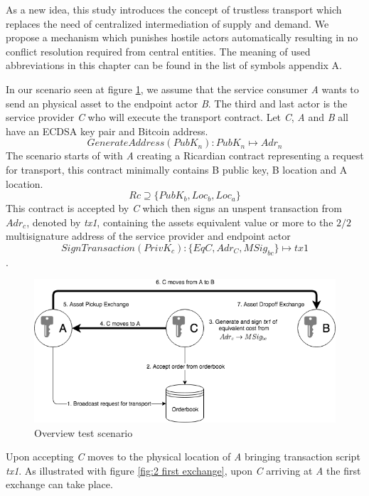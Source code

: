 As a new idea, this study introduces the concept of trustless transport which replaces the need of centralized intermediation of supply and demand. We propose a mechanism which punishes hostile actors automatically resulting in no conflict resolution required from central entities. The meaning of used abbreviations in this chapter can be found in the list of symbols appendix A.\par
In our scenario seen at figure \ref{fig:1 main overview}, we assume that the service consumer \textit{A} wants to send an physical asset to the endpoint actor \textit{B}. The third and last actor is the service provider \textit{C} who will execute the transport contract. Let \textit{C}, \textit{A} and \textit{B} all have an ECDSA key pair and Bitcoin address. \[GenerateAddress(PubK_n)\colon PubK_n \mapsto Adr_n\]
The scenario starts of with \textit{A} creating a Ricardian contract representing a request for transport, this contract minimally contains B public key, B location and A location.
\[Rc \supseteq \{PubK_b, Loc_b, Loc_a\}\]
This contract is accepted by \textit{C} which then signs an unspent transaction from $Adr_c$, denoted by \textit{tx1}, containing the assets equivalent value or more to the $2/2$ multisignature address of the service provider and endpoint actor
\[SignTransaction(PrivK_c)\colon\{EqC, Adr_C, MSig_{bc}\}\mapsto tx1\].

\begin{figure}[h]
\centering
\includegraphics[width=1\textwidth]{images/main.png}
\caption{Overview test scenario}
\label{fig:1 main overview}
\end{figure}

Upon accepting \textit{C} moves to the physical location of \textit{A} bringing transaction script \textit{tx1}. As illustrated with figure \ref{fig:2 first exchange}, upon \textit{C} arriving at \textit{A} the first exchange can take place. 

